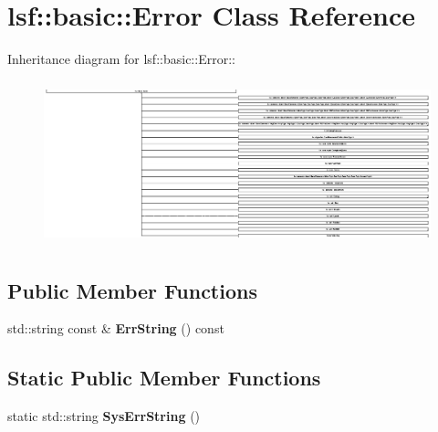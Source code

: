 \hypertarget{classlsf_1_1basic_1_1Error}{
\section{lsf::basic::Error Class Reference}
\label{classlsf_1_1basic_1_1Error}
}
Inheritance diagram for lsf::basic::Error::\begin{figure}[H]
\begin{center}
\leavevmode
\includegraphics[height=4.7881cm]{classlsf_1_1basic_1_1Error}
\end{center}
\end{figure}
\subsection*{Public Member Functions}
\begin{DoxyCompactItemize}
\item 
\hypertarget{classlsf_1_1basic_1_1Error_aa66896c6cd0ac590bfa326d39b2a2865}{
std::string const \& {\bfseries ErrString} () const }
\label{classlsf_1_1basic_1_1Error_aa66896c6cd0ac590bfa326d39b2a2865}

\end{DoxyCompactItemize}
\subsection*{Static Public Member Functions}
\begin{DoxyCompactItemize}
\item 
\hypertarget{classlsf_1_1basic_1_1Error_aae00b39eca9e259591e3ece619bd2eca}{
static std::string {\bfseries SysErrString} ()}
\label{classlsf_1_1basic_1_1Error_aae00b39eca9e259591e3ece619bd2eca}

\end{DoxyCompactItemize}
